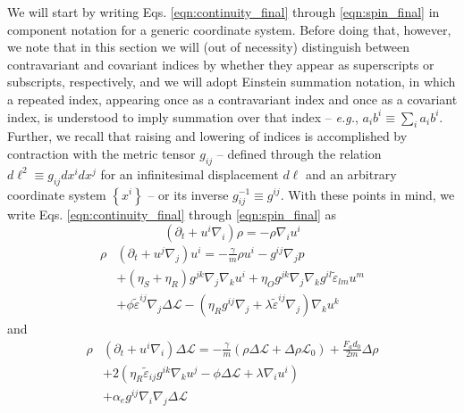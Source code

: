 \documentclass[%
 reprint,
superscriptaddress,
longbibliography,
 amsmath,amssymb,
 prl,
 citeautoscript,
]{revtex4-1}
\begin{document}
We will start by writing Eqs. \ref{eqn:continuity_final} through \ref{eqn:spin_final} in component notation for a generic coordinate system. Before doing that, however, we note that in this section we will (out of necessity) distinguish between contravariant and covariant indices \cite{Landau_Vol2} by whether they appear as superscripts or subscripts, respectively, and we will adopt Einstein summation notation, in which a repeated index, appearing once as a contravariant index and once as a covariant index, is understood to imply summation over that index -- {\it e.g.}, $a_i b^i \equiv \sum_i a_i b^i$. Further, we recall that raising and lowering of indices is accomplished by contraction with the metric tensor $g_{ij}$ -- defined through the relation $d \ell^2 \equiv g_{ij} dx^i dx^j$ for an infinitesimal displacement $d \ell$ and an arbitrary coordinate system $\left\{ x^i \right\}$ -- or its inverse $g^{-1}_{ij} \equiv g^{ij}$. With these points in mind, we write Eqs. \ref{eqn:continuity_final} through \ref{eqn:spin_final} as
\begin{equation}
\left( \partial_t + u^i \nabla_i \right) \rho = - \rho \nabla_i u^i
\label{eqn:continuity_component_generic}
\end{equation}
\begin{equation}
\begin{split}
\rho &\left( \partial_t + u^j \nabla_j \right) u^i = - \frac{\gamma}{m} \rho u^i - g^{ij} \nabla_j p \\
&+ \left( \eta_S + \eta_R \right) g^{jk} \nabla_j \nabla_k u^i + \eta_O g^{jk} \nabla_j \nabla_k g^{il} \tilde{\varepsilon}_{lm} u^m \\
&+ \phi \tilde{\varepsilon}^{ij} \nabla_j \Delta \mathcal{L} - \left( \eta_R g^{ij} \nabla_j + \lambda \tilde{\varepsilon}^{ij} \nabla_j \right) \nabla_k u^k
\end{split}
\label{eqn:lin_momentum_component_generic}
\end{equation}
and
\begin{equation}
\begin{split}
\rho &\left( \partial_t + u^i \nabla_i \right) \Delta \mathcal{L} = - \frac{\gamma}{m} \left( \rho \Delta \mathcal{L} + \Delta \rho \mathcal{L}_0 \right) + \frac{F_a d_0}{2m} \Delta \rho \\
&+ 2 \left( \eta_R \tilde{\varepsilon}_{ij} g^{ik} \nabla_k u^j - \phi \Delta \mathcal{L} + \lambda \nabla_i u^i \right) \\
&+ \alpha_e g^{ij} \nabla_i \nabla_j \Delta \mathcal{L}
\end{split}
\label{eqn:spin_component_generic}
\end{equation}
\end{document}
